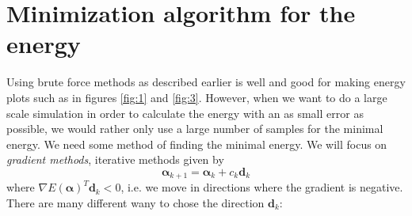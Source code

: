 \documentclass[aps,prc,twocolumn,floatfix]{revtex4}
\def\alphavec{\boldsymbol\alpha}
\def\dvec{\textbf{d}}
\begin{document}
\section{Minimization algorithm for the energy}
\label{sec:minimize}

Using brute force methods as described earlier is well and good for making energy plots such as in figures \ref{fig:1} and \ref{fig:3}. However, when we want to do a large scale simulation in order to calculate the energy with an as small error as possible, we would rather only use a large number of samples for the minimal energy. We need some method of finding the minimal energy. We will focus on {\it gradient methods}, iterative methods given by 
 \begin{equation}
  \alphavec_{k+1} = \alphavec_k + c_k\dvec_k
 \end{equation}
where $\nabla E(\alphavec)^T \dvec_k < 0$, i.e. we move in directions where the gradient is negative. There are many different wany to chose the direction $\dvec_k$: 
\end{document}
